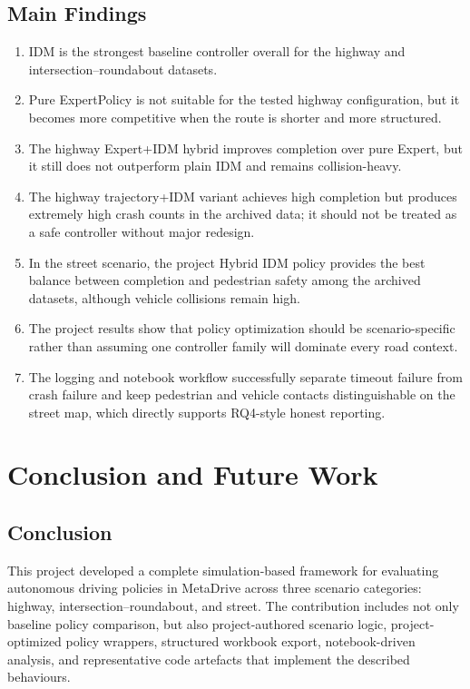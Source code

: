 \documentclass[12pt,a4paper]{report}
\begin{document}
\section{Main Findings}
\begin{enumerate}[label=\arabic*.]
    \item IDM is the strongest baseline controller overall for the highway and intersection--roundabout datasets.
    \item Pure ExpertPolicy is not suitable for the tested highway configuration, but it becomes more competitive when the route is shorter and more structured.
    \item The highway Expert+IDM hybrid improves completion over pure Expert, but it still does not outperform plain IDM and remains collision-heavy.
    \item The highway trajectory+IDM variant achieves high completion but produces extremely high crash counts in the archived data; it should not be treated as a safe controller without major redesign.
    \item In the street scenario, the project Hybrid IDM policy provides the best balance between completion and pedestrian safety among the archived datasets, although vehicle collisions remain high.
    \item The project results show that policy optimization should be scenario-specific rather than assuming one controller family will dominate every road context.
    \item The logging and notebook workflow successfully separate timeout failure from crash failure and keep pedestrian and vehicle contacts distinguishable on the street map, which directly supports RQ4-style honest reporting.
\end{enumerate}

\chapter{Conclusion and Future Work}

\section{Conclusion}
This project developed a complete simulation-based framework for evaluating autonomous driving policies in MetaDrive across three scenario categories: highway, intersection--roundabout, and street. The contribution includes not only baseline policy comparison, but also project-authored scenario logic, project-optimized policy wrappers, structured workbook export, notebook-driven analysis, and representative code artefacts that implement the described behaviours.
\end{document}
